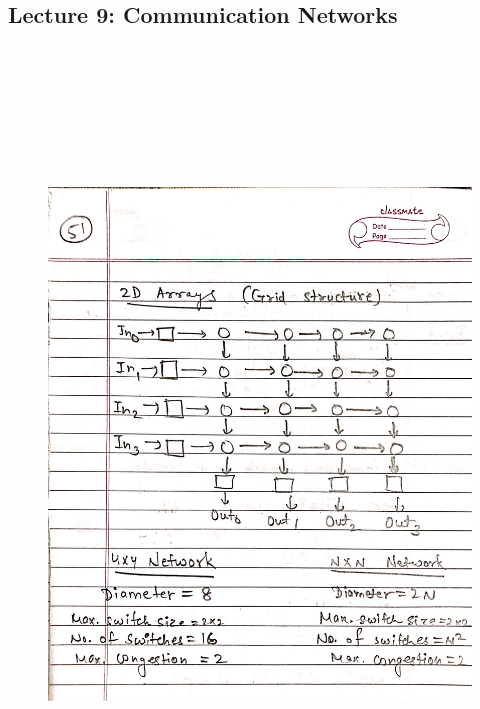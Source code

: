 \newpage
{\color{black} \subsection*{Lecture 9: Communication Networks}}
\begin{figure}[H]
    \centering
    \includegraphics[width=16cm, height=21cm]{"./MIT-6.042J/MIT-6042J-051"}
\end{figure}

